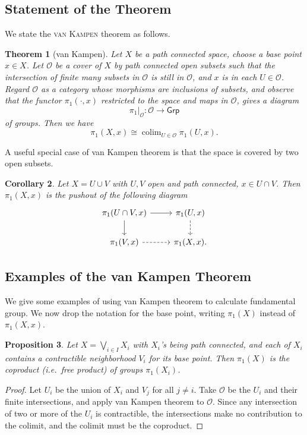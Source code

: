 \documentclass[a4paper]{amsart}
\theoremstyle{plain}
\newtheorem{thm}{Theorem}[section]
\newtheorem{prop}[thm]{Proposition}
\newtheorem{cor}[thm]{Corollary}
\theoremstyle{definition}
\theoremstyle{remark}
\DeclareMathOperator*{\colim}{colim}
\begin{document}
\subsection{Statement of the Theorem}

We state the \textsc{van Kampen} theorem as follows.
\begin{thm}[van Kampen]\label{van Kampen}
    Let $X$ be a path connected space, choose a base point $x\in X$.
    Let $\mathscr{O}$ be a cover of $X$ by path connected open subsets such that the intersection of finite many subsets in $\mathscr{O}$ is still in $\mathscr{O}$, and $x$ is in each $U\in\mathscr{O}$.
    Regard $\mathscr{O}$ as a category whose morphisms are inclusions of subsets, and observe that the functor $\pi_1(\cdot,x)$ restricted to the space and maps in $\mathscr{O}$, gives a diagram
    \[\pi_1|_\mathscr{O}:\mathscr{O}\to\mathsf{Grp}\]
    of groups.
    Then we have
    \[\pi_1(X,x)\cong\colim_{U\in\mathscr{O}}\pi_1(U,x).\] 
\end{thm}

A useful special case of van Kampen theorem is that the space is covered by two open subsets.
\begin{cor}
    Let $X=U\cup V$ with $U,V$ open and path connected, $x\in U\cap V$.
    Then $\pi_1(X,x)$ is the pushout of the following diagram
    \[\begin{tikzcd}
        \pi_1(U\cap V,x) \ar[r] \ar[d] & \pi_1(U,x) \ar[d, dashed] \\
        \pi_1(V,x) \ar[r, dashed] & \pi_1(X,x).
    \end{tikzcd}\]
\end{cor}

\subsection{Examples of the van Kampen Theorem}

We give some examples of using van Kampen theorem to calculate fundamental group.
We now drop the notation for the base point, writing $\pi_1(X)$ instead of $\pi_1(X,x)$.

\begin{prop}
    Let $X=\bigvee_{i\in I}X_i$ with $X_i$'s being path connected, and each of $X_i$ contains a contractible neighborhood $V_i$ for its base point.
    Then $\pi_1(X)$ is the coproduct (i.e.\ free product) of groups $\pi_1(X_i)$.
\end{prop}
\begin{proof}
    Let $U_i$ be the union of $X_i$ and $V_j$ for all $j\neq i$.
    Take $\mathscr{O}$ be the $U_i$ and their finite intersections, and apply van Kampen theorem to $\mathscr{O}$.
    Since any intersection of two or more of the $U_i$ is contractible, the intersections make no contribution to the colimit, and the colimit must be the coproduct.
\end{proof}
\end{document}
